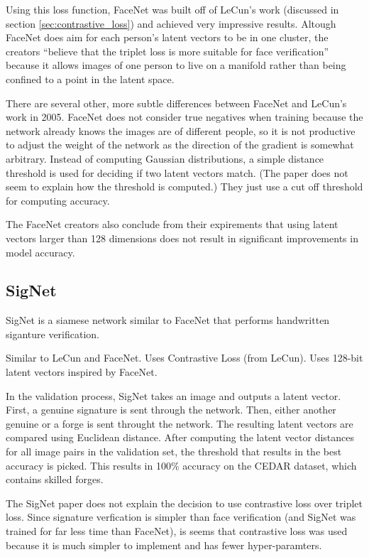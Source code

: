 Using this loss function, FaceNet was built off of LeCun's work (discussed in section \ref{sec:contrastive_loss}) and achieved very impressive results\cite{face_net}.
Altough FaceNet does aim for each person's latent vectors to be in one cluster, the creators ``believe that the triplet loss is more suitable for face verification'' because it allows images of one person to live on a manifold rather than being confined to a point in the latent space\cite{face_net}.

There are several other, more subtle differences between FaceNet and LeCun's work in 2005.
FaceNet does not consider true negatives when training because the network already knows the images are of different people, so it is not productive to adjust the weight of the network as the direction of the gradient is somewhat arbitrary.
Instead of computing Gaussian distributions, a simple distance threshold is used for deciding if two latent vectors match.
(The paper does not seem to explain how the threshold is computed.)
They just use a cut off threshold for computing accuracy.

The FaceNet creators also conclude from their expirements that using latent vectors larger than 128 dimensions does not result in significant improvements in model accuracy\cite{FaceNet}.


\subsection{SigNet}

SigNet is a siamese network similar to FaceNet that performs handwritten siganture verification.

Similar to LeCun and FaceNet.
Uses Contrastive Loss (from LeCun).
Uses 128-bit latent vectors inspired by FaceNet.


In the validation process, SigNet takes an image and outputs a latent vector.
First, a genuine signature is sent through the network.
Then, either another genuine or a forge is sent throught the network.
The resulting latent vectors are compared using Euclidean distance.
After computing the latent vector distances for all image pairs in the validation set, the threshold that results in the best accuracy is picked.
This results in 100\% accuracy on the CEDAR dataset, which contains skilled forges.

The SigNet paper does not explain the decision to use contrastive loss over triplet loss.
Since signature verfication is simpler than face verification (and SigNet was trained for far less time than FaceNet), is seems that contrastive loss was used because it is much simpler to implement and has fewer hyper-paramters.


